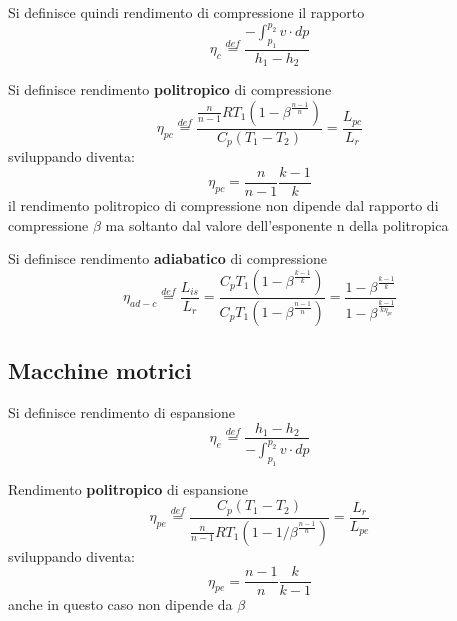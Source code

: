 \documentclass[a4paper,12pt]{article}
\begin{document}
Si definisce quindi rendimento di compressione il rapporto
\begin{equation}
    \label{eq:rendimento_compressione}
    \eta_{c} \stackrel{def}{=} \frac{- \displaystyle \int_{p_1}^{p_2} v \cdot dp}{h_1 - h_2}
\end{equation}

Si definisce rendimento \textbf{politropico} di compressione
\begin{equation}
    \label{eq:rendimento_compressione_politropico}
    \eta_{pc} \stackrel{def}{=} \frac{\displaystyle\frac{n}{n-1} R T_1 \left(1-\beta^{\displaystyle\frac{n-1}{n}} \right)}{C_p \left(T_1 - T_2\right)}
    = \frac{L_{pc}}{L_r}
\end{equation}
sviluppando diventa:
\begin{equation}
    \eta_{pc} = \frac{n}{n-1} \frac{k-1}{k}
\end{equation}
il rendimento politropico di compressione non dipende dal rapporto di compressione $\beta$
ma soltanto dal valore dell'esponente n della politropica

Si definisce rendimento \textbf{adiabatico} di compressione
\begin{equation}
    \label{eq:rendimento_compressione_adiabatico}
    \eta_{ad-c} \stackrel{def}{=} \frac{L_{is}}{L_r} = \frac{ C_p T_1 \left(1-\beta^{\displaystyle\frac{k-1}{k}}\right)}
    {C_p T_1 \left(1-\beta^{\displaystyle\frac{n-1}{n}}\right)} = \frac{1-\beta^{\displaystyle\frac{k-1}{k}}}{1-\beta^{\displaystyle\frac{k-1}{k\eta_{pc}}}}
\end{equation}

\subsection{Macchine motrici}
\label{subsec:macchine_motrici}

Si definisce rendimento di espansione
\begin{equation}
    \label{eq:rendimento_espansione}
    \eta_{e} \stackrel{def}{=} \frac{h_1 - h_2}{- \displaystyle \int_{p_1}^{p_2} v \cdot dp}
\end{equation}

Rendimento \textbf{politropico} di espansione
\begin{equation}
    \label{eq:rendimento_espansione_politropico}
    \eta_{pe} \stackrel{def}{=} \frac{C_p \left(T_1 - T_2\right)}{\displaystyle\frac{n}{n-1} R T_1 \left(1-1/\beta^{\displaystyle\frac{n-1}{n}} \right)}
    = \frac{L_r}{L_{pe}}
\end{equation}
sviluppando diventa:
\begin{equation}
    \eta_{pe} = \frac{n-1}{n} \frac{k}{k-1} 
\end{equation}
anche in questo caso non dipende da $\beta$
\end{document}
